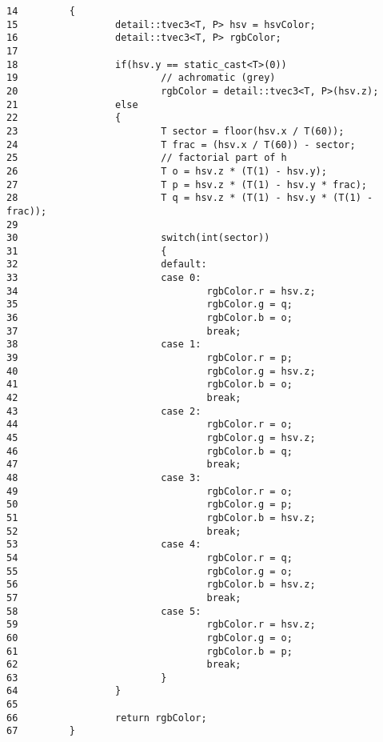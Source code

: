 \begin{Code}\begin{verbatim}14         {
15                 detail::tvec3<T, P> hsv = hsvColor;
16                 detail::tvec3<T, P> rgbColor;
17 
18                 if(hsv.y == static_cast<T>(0))
19                         // achromatic (grey)
20                         rgbColor = detail::tvec3<T, P>(hsv.z);
21                 else
22                 {
23                         T sector = floor(hsv.x / T(60));
24                         T frac = (hsv.x / T(60)) - sector;
25                         // factorial part of h
26                         T o = hsv.z * (T(1) - hsv.y);
27                         T p = hsv.z * (T(1) - hsv.y * frac);
28                         T q = hsv.z * (T(1) - hsv.y * (T(1) - frac));
29 
30                         switch(int(sector))
31                         {
32                         default:
33                         case 0:
34                                 rgbColor.r = hsv.z;
35                                 rgbColor.g = q;
36                                 rgbColor.b = o;
37                                 break;
38                         case 1:
39                                 rgbColor.r = p;
40                                 rgbColor.g = hsv.z;
41                                 rgbColor.b = o;
42                                 break;
43                         case 2:
44                                 rgbColor.r = o;
45                                 rgbColor.g = hsv.z;
46                                 rgbColor.b = q;
47                                 break;
48                         case 3:
49                                 rgbColor.r = o;
50                                 rgbColor.g = p;
51                                 rgbColor.b = hsv.z;
52                                 break;
53                         case 4:
54                                 rgbColor.r = q; 
55                                 rgbColor.g = o; 
56                                 rgbColor.b = hsv.z;
57                                 break;
58                         case 5:
59                                 rgbColor.r = hsv.z; 
60                                 rgbColor.g = o; 
61                                 rgbColor.b = p;
62                                 break;
63                         }
64                 }
65 
66                 return rgbColor;
67         }
\end{verbatim}
\end{Code}




